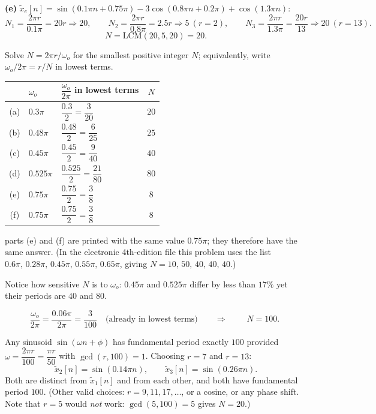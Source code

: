 \textbf{(e)} $\tilde{x}_e[n]=\sin(0.1\pi n+0.75\pi)-3\cos(0.8\pi n+0.2\pi)+\cos(1.3\pi n)$:
\[
N_1=\frac{2\pi r}{0.1\pi}=20r\Rightarrow 20,\qquad
N_2=\frac{2\pi r}{0.8\pi}=2.5r\Rightarrow 5\ (r=2),\qquad
N_3=\frac{2\pi r}{1.3\pi}=\frac{20r}{13}\Rightarrow 20\ (r=13).
\]
\[
\boxed{\;N=\mathrm{LCM}(20,5,20)=20 .\;}
\]


Solve $N=2\pi r/\omega_o$ for the smallest positive integer $N$; equivalently, write
$\omega_o/2\pi = r/N$ in lowest terms.

\begin{center}
\renewcommand{\arraystretch}{1.5}
\begin{tabular}{@{}cllc@{}}
\toprule
& $\omega_o$ & $\dfrac{\omega_o}{2\pi}$ in lowest terms & $N$\\
\midrule
(a) & $0.3\pi$   & $\dfrac{0.3}{2}=\dfrac{3}{20}$    & $\boxed{20}$\\
(b) & $0.48\pi$  & $\dfrac{0.48}{2}=\dfrac{6}{25}$   & $\boxed{25}$\\
(c) & $0.45\pi$  & $\dfrac{0.45}{2}=\dfrac{9}{40}$   & $\boxed{40}$\\
(d) & $0.525\pi$ & $\dfrac{0.525}{2}=\dfrac{21}{80}$ & $\boxed{80}$\\
(e) & $0.75\pi$  & $\dfrac{0.75}{2}=\dfrac{3}{8}$    & $\boxed{8}$\\
(f) & $0.75\pi$  & $\dfrac{0.75}{2}=\dfrac{3}{8}$    & $\boxed{8}$\\
\bottomrule
\end{tabular}
\end{center}
\Mis parts (e) and (f) are printed with the same value $0.75\pi$; they therefore have the
same answer. (In the electronic 4th-edition file this problem uses the list
$0.6\pi,\,0.28\pi,\,0.45\pi,\,0.55\pi,\,0.65\pi$, giving $N=10,\,50,\,40,\,40,\,40$.)

Notice how sensitive $N$ is to $\omega_o$: $0.45\pi$ and $0.525\pi$ differ by less than
$17\%$ yet their periods are $40$ and $80$.


\[
\frac{\omega_o}{2\pi}=\frac{0.06\pi}{2\pi}=\frac{3}{100}\quad\text{(already in lowest terms)}
\qquad\Longrightarrow\qquad \boxed{\;N=100 .\;}
\]

Any sinusoid $\sin(\omega n+\phi)$ has fundamental period exactly $100$ provided
$\omega=\dfrac{2\pi r}{100}=\dfrac{\pi r}{50}$ with $\gcd(r,100)=1$. Choosing $r=7$ and
$r=13$:
\[
\boxed{\;\tilde{x}_2[n]=\sin(0.14\pi n),\qquad \tilde{x}_3[n]=\sin(0.26\pi n).\;}
\]
Both are distinct from $\tilde{x}_1[n]$ and from each other, and both have fundamental period
$100$. (Other valid choices: $r=9,11,17,\dots$, or a cosine, or any phase shift. Note that
$r=5$ would \emph{not} work: $\gcd(5,100)=5$ gives $N=20$.)

